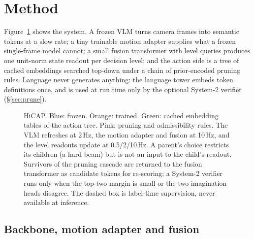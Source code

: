 \section{Method}\label{sec:method}
Figure~\ref{fig:arch} shows the system. A frozen VLM turns camera frames into semantic tokens at a slow rate; a tiny trainable
motion adapter supplies what a frozen single-frame model cannot; a small fusion transformer with level queries produces one unit-norm
state readout per decision level; and the action side is a tree of cached embeddings searched top-down under a chain of prior-encoded
pruning rules. Language never generates anything: the language tower embeds token definitions once, and is used at run time only by the
optional System-2 verifier (\S\ref{sec:prune}).

\begin{figure}[p]
\centering
\resizebox{\textwidth}{!}{}
\caption{HiCAP. Blue: frozen. Orange: trained. Green: cached embedding tables of the action tree. Pink: pruning and admissibility rules. The VLM refreshes at 2\,Hz, the motion adapter and fusion at
10\,Hz, and the level readouts update at 0.5/2/10\,Hz. A parent's choice restricts its children (a hard beam) but is not an input to the child's readout. Survivors of the pruning cascade are returned to the fusion transformer as candidate tokens for re-scoring;
a System-2 verifier runs only when the top-two margin is small or the two imagination heads disagree. The dashed box is label-time supervision, never available at inference.}
\label{fig:arch}
\end{figure}

\subsection{Backbone, motion adapter and fusion}\label{sec:backbone}
